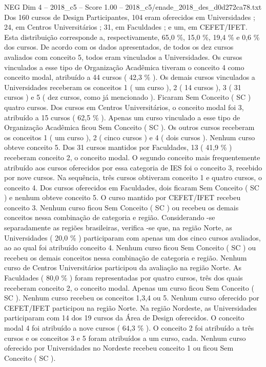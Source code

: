 \begin{textsample}{NEG Dim 4 – 2018\_c5 – Score 1.00 – 2018\_c5/enade\_2018\_des\_d0d272ca78.txt}
Dos 160 cursos de Design Participantes, 104 eram oferecidos em Universidades ; 24, em Centros Universitários ; 31, em Faculdades ; e um, em CEFET/IFET.
Esta distribuição corresponde a, respectivamente, 65,0 \%, 15,0 \%, 19,4 \% e 0,6 \% dos cursos.
De acordo com os dados apresentados, de todos os dez cursos avaliados com conceito 5, todos eram vinculados a Universidades.
Os cursos vinculados a esse tipo de Organização Acadêmica tiveram o conceito 4 como conceito modal, atribuído a 44 cursos ( 42,3 \% ).
Os demais cursos vinculados a Universidades receberam os conceitos 1 ( um curso ), 2 ( 14 cursos ), 3 ( 31 cursos ) e 5 ( dez cursos, como já mencionado ).
Ficaram Sem Conceito ( SC ) quatro cursos.
Dos cursos em Centros Universitários, o conceito modal foi 3, atribuído a 15 cursos ( 62,5 \% ).
Apenas um curso vinculado a esse tipo de Organização Acadêmica ficou Sem Conceito ( SC ).
Os outros cursos receberam os conceitos 1 ( um curso ), 2 ( cinco cursos ) e 4 ( dois cursos ).
Nenhum curso obteve conceito 5.
Dos 31 cursos mantidos por Faculdades, 13 ( 41,9 \% ) receberam conceito 2, o conceito modal.
O segundo conceito mais frequentemente atribuído aos cursos oferecidos por essa categoria de IES foi o conceito 3, recebido por nove cursos.
Na sequência, três cursos obtiveram conceito 1 e quatro cursos, o conceito 4.
Dos cursos oferecidos em Faculdades, dois ficaram Sem Conceito ( SC ) e nenhum obteve conceito 5.
O curso mantido por CEFET/IFET recebeu conceito 3.
Nenhum curso ficou Sem Conceito ( SC ) ou recebeu os demais conceitos nessa combinação de categoria e região.
Considerando -se separadamente as regiões brasileiras, verifica -se que, na região Norte, as Universidades ( 20,0 \% ) participaram com apenas um dos cinco cursos avaliados, ao ao qual foi atribuído conceito 4.
Nenhum curso ficou Sem Conceito ( SC ) ou recebeu os demais conceitos nessa combinação de categoria e região.
Nenhum curso de Centros Universitários participou da avaliação na região Norte.
As Faculdades ( 80,0 \% ) foram representadas por quatro cursos, três dos quais receberam conceito 2, o conceito modal.
Apenas um curso ficou Sem Conceito ( SC ).
Nenhum curso recebeu os conceitos 1,3,4 ou 5.
Nenhum curso oferecido por CEFET/IFET participou na região Norte.
Na região Nordeste, as Universidades participaram com 14 dos 19 cursos da Área de Design oferecidos.
O conceito modal 4 foi atribuído a nove cursos ( 64,3 \% ).
O conceito 2 foi atribuído a três cursos e os conceitos 3 e 5 foram atribuídos a um curso, cada.
Nenhum curso oferecido por Universidades no Nordeste recebeu conceito 1 ou ficou Sem Conceito ( SC ).

\end{textsample}
